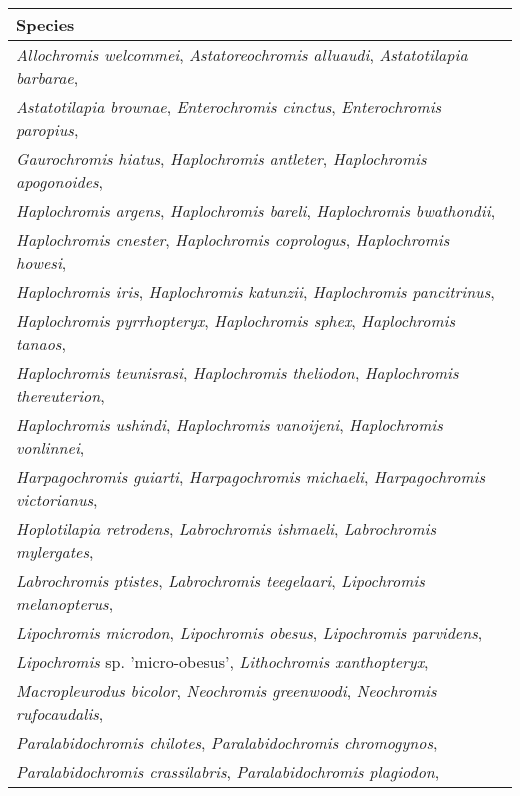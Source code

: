 \begin{table}[]
\centering
\begin{tabular}{l}
\toprule 
\textbf{Species} \\ \midrule
 \textit{Allochromis welcommei},  \textit{Astatoreochromis alluaudi},  \textit{Astatotilapia barbarae},  \\
 \textit{Astatotilapia brownae},  \textit{Enterochromis cinctus},  \textit{Enterochromis paropius},  \\
 \textit{Gaurochromis hiatus},  \textit{Haplochromis antleter},  \textit{Haplochromis apogonoides},  \\
 \textit{Haplochromis argens},  \textit{Haplochromis bareli},  \textit{Haplochromis bwathondii},  \\
 \textit{Haplochromis cnester},  \textit{Haplochromis coprologus},  \textit{Haplochromis howesi},  \\
 \textit{Haplochromis iris},  \textit{Haplochromis katunzii},  \textit{Haplochromis pancitrinus},  \\
 \textit{Haplochromis pyrrhopteryx},  \textit{Haplochromis sphex},  \textit{Haplochromis tanaos},  \\
 \textit{Haplochromis teunisrasi},  \textit{Haplochromis theliodon},  \textit{Haplochromis thereuterion},  \\
 \textit{Haplochromis ushindi},  \textit{Haplochromis vanoijeni},  \textit{Haplochromis vonlinnei},   \\
 \textit{Harpagochromis guiarti},  \textit{Harpagochromis michaeli},  \textit{Harpagochromis victorianus},  \\
 \textit{Hoplotilapia retrodens},  \textit{Labrochromis ishmaeli},  \textit{Labrochromis mylergates},   \\
 \textit{Labrochromis ptistes},  \textit{Labrochromis teegelaari},  \textit{Lipochromis melanopterus},  \\
 \textit{Lipochromis microdon},  \textit{Lipochromis obesus},  \textit{Lipochromis parvidens},  \\
 \textit{Lipochromis} sp. 'micro-obesus', \textit{Lithochromis xanthopteryx},  \\
 \textit{Macropleurodus bicolor},  \textit{Neochromis greenwoodi},  \textit{Neochromis rufocaudalis},  \\
 \textit{Paralabidochromis chilotes},  \textit{Paralabidochromis chromogynos},  \\
 \textit{Paralabidochromis crassilabris},  \textit{Paralabidochromis plagiodon},  \\

\end{tabular}
\end{table}

